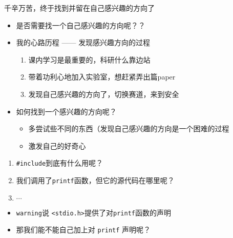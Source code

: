 \documentclass{ctexbeamer} %
\begin{document}
\begin{frame}
	\begin{center}\Large
	千辛万苦，终于找到并留在自己感兴趣的方向了
	\end{center}
\end{frame}

\begin{frame}
	\begin{itemize}
		\item 是否需要找一个自己感兴趣的方向呢？？
		\item 我的心路历程 —— \small{发现感兴趣方向的过程}
		\begin{enumerate}
			\item 课内学习是最重要的，科研什么靠边站
			\item 带着功利心地加入实验室，想赶紧弄出篇paper
			\item 发现自己感兴趣的方向了，切换赛道，来到安全
		\end{enumerate}
		\item 如何找到一个感兴趣的方向呢？
		\begin{itemize}
			\item 多尝试些不同的东西（发现自己感兴趣的方向是一个困难的过程
			\item 激发自己的好奇心
		\end{itemize}
	\end{itemize}
\end{frame}

\begin{frame}[fragile]
	
	\pause
	\begin{enumerate}
		\item \texttt{\#include}到底有什么用呢？
		\item 我们调用了\texttt{printf}函数，但它的源代码在哪里呢？
		\item $\cdots$
	\end{enumerate}
\end{frame}

\begin{frame}[fragile]
	

	
	
	\begin{itemize}
		\item \texttt{warning}说 \texttt{<stdio.h>}提供了对\texttt{printf}函数的声明
		\item 那我们能不能自己加上对 \texttt{printf} 声明呢？
	\end{itemize}
\end{frame}
\end{document}

